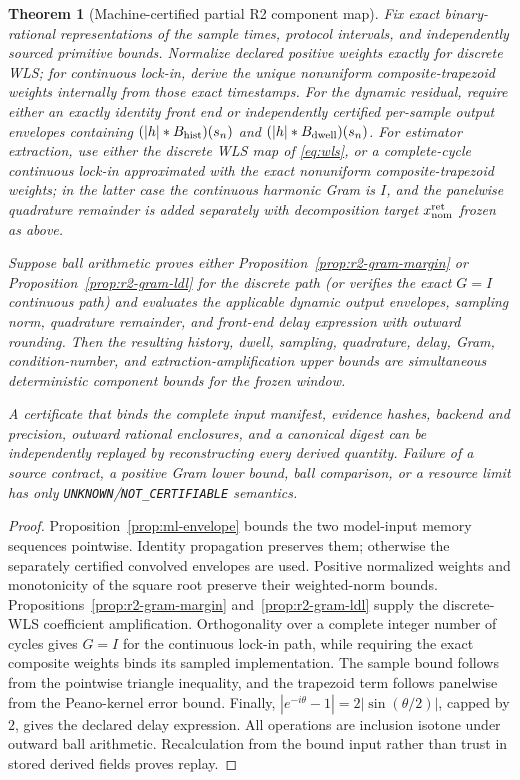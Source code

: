 \documentclass[11pt]{article}
\newtheorem{theorem}{Theorem}
\theoremstyle{definition}
\theoremstyle{remark}
\begin{document}
\begin{theorem}[Machine-certified partial R2 component map]
\label{thm:r2-component-certificate}
Fix exact binary-rational representations of the sample times, protocol
intervals, and independently sourced primitive bounds.  Normalize declared
positive weights exactly for discrete WLS; for continuous lock-in, derive the
unique nonuniform composite-trapezoid weights internally from those exact
timestamps.  For the dynamic residual, require either an
exactly identity front end or independently certified per-sample output
envelopes containing \((|h|*B_{\rm hist})(s_n)\) and
\((|h|*B_{\rm dwell})(s_n)\).  For estimator extraction, use either the
discrete WLS map of \eqref{eq:wls}, or a complete-cycle continuous lock-in
approximated with the exact nonuniform composite-trapezoid weights; in the
latter case the continuous harmonic Gram is \(I\), and the panelwise
quadrature remainder is added separately with decomposition target
\(x_{\rm nom}^{\rm ret}\) frozen as above.

Suppose ball arithmetic proves either
Proposition~\ref{prop:r2-gram-margin} or
Proposition~\ref{prop:r2-gram-ldl} for the discrete path (or verifies the
exact \(G=I\) continuous path) and evaluates
the applicable dynamic output envelopes, sampling norm, quadrature remainder,
and front-end delay expression with outward rounding.  Then the resulting
history, dwell, sampling, quadrature, delay, Gram, condition-number, and
extraction-amplification upper bounds are simultaneous deterministic
component bounds for the frozen window.

A certificate that binds the complete input manifest, evidence hashes,
backend and precision, outward rational enclosures, and a canonical digest
can be independently replayed by reconstructing every derived quantity.
Failure of a source contract, a positive Gram lower bound, ball comparison,
or a resource limit has only \texttt{UNKNOWN}/\texttt{NOT\_CERTIFIABLE}
semantics.
\end{theorem}
\begin{proof}
Proposition~\ref{prop:ml-envelope} bounds the two model-input memory sequences
pointwise.  Identity propagation preserves them; otherwise the separately
certified convolved envelopes are used.  Positive normalized weights and
monotonicity of the square root preserve their weighted-norm bounds.
Propositions~\ref{prop:r2-gram-margin} and~\ref{prop:r2-gram-ldl} supply the
discrete-WLS coefficient amplification.  Orthogonality over a complete
integer number of cycles gives
\(G=I\) for the continuous lock-in path, while requiring the exact composite
weights binds its sampled implementation.  The sample bound follows from the
pointwise triangle inequality, and the trapezoid term follows panelwise from
the Peano-kernel error bound.  Finally,
\(|e^{-i\theta}-1|=2|\sin(\theta/2)|\), capped by \(2\), gives the declared
delay expression.  All operations are inclusion isotone under outward ball
arithmetic.  Recalculation from the bound input rather than trust in stored
derived fields proves replay.
\end{proof}
\end{document}
